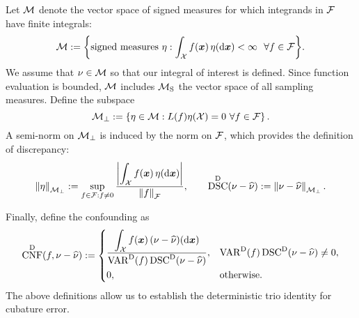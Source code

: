 \documentclass[graybox,footinfo]{svmult}
\DeclareMathOperator{\algn}{CNF}
\DeclareMathOperator{\disc}{DSC}
\DeclareMathOperator{\Var}{VAR}
\begin{document}
Let $\mathcal{M}$ denote the vector space of signed measures for which integrands in $\mathcal{F}$ 
have finite integrals:
\begin{equation*}
\cm : = \biggl \{\text{signed measures } \eta : \int_{\cx} f(\bsx) \, \eta(\D\bsx) < \infty \ \ 
\forall f \in \cf \biggr \}.
\end{equation*}
We assume that $\nu \in \mathcal{M}$ so that our integral of interest is defined.  Since function 
evaluation is bounded, $\mathcal{M}$ includes $\mathcal{M}_{\textup{S}}$ the vector space of all 
sampling measures.  Define the subspace  
\begin{equation} \label{FJH:eq:Mperpdef}
\cm_\bot : = \left \{\eta \in \cm :  L(f) \eta(\cx) = 0  \ \forall f \in \cf
\right\}.
\end{equation} 
A semi-norm on $\mathcal{M}_\bot$ is induced by the norm on $\mathcal{F}$, which provides the 
definition of discrepancy:
\begin{equation} \label{FJH:eq:detdiscdef}
\snorm{\eta}_{\cm_\bot}  : =\sup_{f \in \cf : f \ne 0} \frac{\displaystyle \biggabs{\int_{\cx} 
f(\bsx) \, \eta(\D \bsx)}}{\norm{f}_{\cf}}, \qquad \disc^\Dt(\nu - \hnu) : = \norm{\nu - 
\hnu}_{\cm_\bot}.
\end{equation}

Finally, define the confounding as 
	\begin{equation} \label{FJH:eq:detconfdef}
\algn^\Dt(f,\nu - \hnu): =  \begin{cases} \displaystyle 
\frac{\displaystyle\int_{\cx} f(\bsx) \, (\nu - \hnu)(\D 
	\bsx)}{\Var^\Dt(f)\disc^\Dt(\nu - \hnu)},  & 
\Var^\Dt(f)\disc^\Dt(\nu - \hnu) \ne 0, \\[2ex]
0, & \text{otherwise}.
\end{cases}
\end{equation}
The above definitions allow us to establish the deterministic trio identity for cubature 
error.
\end{document}
